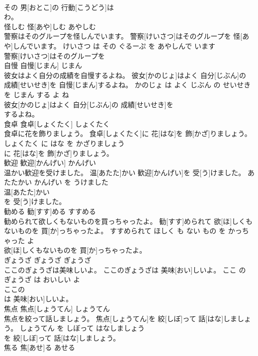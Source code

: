 \documentclass[8pt]{extreport}
\begin{document}
\begin{CJK}{UTF8}{min}
\\	その 男[おとこ]の 行動[こうどう]は
\\	わ。			
\\	怪しむ	怪[あや]しむ	あやしむ	
\\	警察はそのグループを怪しんでいます。	警察[けいさつ]はそのグループを 怪[あや]しんでいます。	けいさつ は その ぐるーぷ を あやしんで います	
\\	警察[けいさつ]はそのグループを
\\	自慢	自慢[じまん]	じまん	
\\	彼女はよく自分の成績を自慢するよね。	彼女[かのじょ]はよく 自分[じぶん]の 成績[せいせき]を 自慢[じまん]するよね。	かのじょ は よく じぶん の せいせき を じまん する よ ね	
\\	彼女[かのじょ]はよく 自分[じぶん]の 成績[せいせき]を
\\	するよね。			
\\	食卓	食卓[しょくたく]	しょくたく	
\\	食卓に花を飾りましょう。	食卓[しょくたく]に 花[はな]を 飾[かざ]りましょう。	しょくたく に はな を かざりましょう	
\\	に 花[はな]を 飾[かざ]りましょう。			
\\	歓迎	歓迎[かんげい]	かんげい	
\\	温かい歓迎を受けました。	温[あたた]かい 歓迎[かんげい]を 受[う]けました。	あたたかい かんげい を うけました	
\\	温[あたた]かい
\\	を 受[う]けました。			
\\	勧める	勧[すす]める	すすめる	
\\	勧められて欲しくもないものを買っちゃったよ。	勧[すす]められて 欲[ほ]しくもないものを 買[か]っちゃったよ。	すすめられて ほしく も ない もの を かっちゃった よ	
\\	欲[ほ]しくもないものを 買[か]っちゃったよ。			
\\	ぎょうざ	ぎょうざ	ぎょうざ	
\\	ここのぎょうざは美味しいよ。	ここのぎょうざは 美味[おい]しいよ。	ここ の ぎょうざ は おいしい よ	
\\	ここの
\\	は 美味[おい]しいよ。			
\\	焦点	焦点[しょうてん]	しょうてん	
\\	焦点を絞って話しましょう。	焦点[しょうてん]を 絞[しぼ]って 話[はな]しましょう。	しょうてん を しぼって はなしましょう	
\\	を 絞[しぼ]って 話[はな]しましょう。			
\\	焦る	焦[あせ]る	あせる	

\end{CJK}
\end{document}
